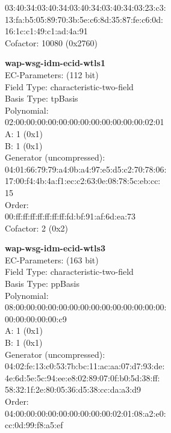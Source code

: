     03:40:34:03:40:34:03:40:34:03:40:34:03:23:c3:\\
    13:fa:b5:05:89:70:3b:5e:c6:8d:35:87:fe:c6:0d:\\
    16:1c:c1:49:c1:ad:4a:91\\
Cofactor:  10080 (0x2760)\\
\item \textbf{ wap-wsg-idm-ecid-wtls1 }\\
EC-Parameters: (112 bit)\\
Field Type: characteristic-two-field\\
Basis Type: tpBasis\\
Polynomial:\\
    02:00:00:00:00:00:00:00:00:00:00:00:00:02:01\\
A:    1 (0x1)\\
B:    1 (0x1)\\
Generator (uncompressed):\\
    04:01:66:79:79:a4:0b:a4:97:e5:d5:c2:70:78:06:\\
    17:00:f4:4b:4a:f1:ec:c2:63:0e:08:78:5c:eb:cc:\\
    15\\
Order: \\
    00:ff:ff:ff:ff:ff:ff:ff:fd:bf:91:af:6d:ea:73\\
Cofactor:  2 (0x2)\\
\item \textbf{ wap-wsg-idm-ecid-wtls3 }\\
EC-Parameters: (163 bit)\\
Field Type: characteristic-two-field\\
Basis Type: ppBasis\\
Polynomial:\\
    08:00:00:00:00:00:00:00:00:00:00:00:00:00:00:\\
    00:00:00:00:00:c9\\
A:    1 (0x1)\\
B:    1 (0x1)\\
Generator (uncompressed):\\
    04:02:fe:13:c0:53:7b:bc:11:ac:aa:07:d7:93:de:\\
    4e:6d:5e:5c:94:ee:e8:02:89:07:0f:b0:5d:38:ff:\\
    58:32:1f:2e:80:05:36:d5:38:cc:da:a3:d9\\
Order: \\
    04:00:00:00:00:00:00:00:00:00:02:01:08:a2:e0:\\
    cc:0d:99:f8:a5:ef\\
